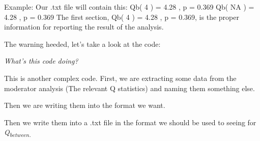 \documentclass[
]{book}
\newenvironment{Shaded}{\begin{snugshade}}{\end{snugshade}}
\newcommand{\AttributeTok}[1]{\textcolor[rgb]{0.13,0.29,0.53}{#1}}
\newcommand{\CommentTok}[1]{\textcolor[rgb]{0.56,0.35,0.01}{\textit{#1}}}
\newcommand{\ConstantTok}[1]{\textcolor[rgb]{0.56,0.35,0.01}{#1}}
\newcommand{\DecValTok}[1]{\textcolor[rgb]{0.00,0.00,0.81}{#1}}
\newcommand{\FunctionTok}[1]{\textcolor[rgb]{0.13,0.29,0.53}{\textbf{#1}}}
\newcommand{\NormalTok}[1]{#1}
\newcommand{\OtherTok}[1]{\textcolor[rgb]{0.56,0.35,0.01}{#1}}
\newcommand{\SpecialCharTok}[1]{\textcolor[rgb]{0.81,0.36,0.00}{\textbf{#1}}}
\newcommand{\StringTok}[1]{\textcolor[rgb]{0.31,0.60,0.02}{#1}}
\begin{document}
Example: Our .txt file will contain this: Qb( 4 ) = 4.28 , p = 0.369 Qb( NA ) = 4.28 , p = 0.369 The first section, Qb( 4 ) = 4.28 , p = 0.369, is the proper information for reporting the result of the analysis.

The warning heeded, let's take a look at the code:

\begin{Shaded}
\end{Shaded}

\emph{What's this code doing?}

This is another complex code. First, we are extracting some data from the moderator analysis (The relevant Q statistics) and naming them something else.

Then we are writing them into the format we want.

Then we write them into a .txt file in the format we should be used to seeing for \emph{Q\textsubscript{between.}}
\end{document}
